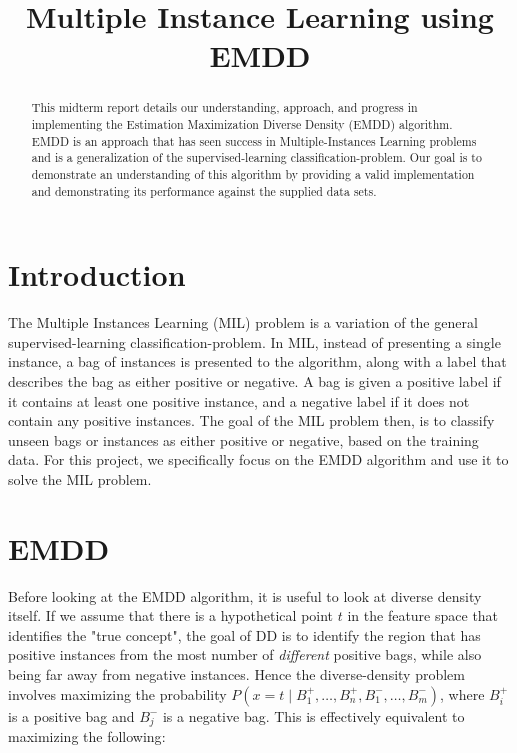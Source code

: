 \documentclass[conference,compsoc]{IEEEtran}
\begin{document}
\title{Multiple Instance Learning using EMDD}

\author{
\and
{}
}

\maketitle

\begin{abstract}
This midterm report details our understanding, approach, and progress in implementing the Estimation Maximization Diverse Density (EMDD)\cite{zhang2001dd} algorithm. EMDD is an approach that has seen success in Multiple-Instances Learning problems and is a generalization of the supervised-learning classification-problem. Our goal is to demonstrate an understanding of this algorithm by providing a valid implementation and demonstrating its performance against the supplied data sets.
\end{abstract}


\IEEEpeerreviewmaketitle


\section{Introduction}
The Multiple Instances Learning (MIL) problem is a variation of the general supervised-learning classification-problem. In MIL, instead of presenting a single instance, a bag of instances is presented to the algorithm, along with a label that describes the bag as either positive or negative. A bag is given a positive label if it contains at least one positive instance, and a negative label if it does not contain any positive instances. The goal of the MIL problem then, is to classify unseen bags or instances as either positive or negative, based on the training data. For this project, we specifically focus on the EMDD algorithm and use it to solve the MIL problem. 

\section{EMDD}

Before looking at the EMDD algorithm, it is useful to look at diverse density itself. If we assume that there is a hypothetical point $t$ in the feature space that identifies the "true concept", the goal of DD is to identify the region that has positive instances from the most number of \textit{different} positive bags, while also being far away from negative instances. Hence the diverse-density problem involves maximizing the probability $P(x = t \mid B_1^+, \dots, B_n^+, B_1^-, \dots, B_m^-)$, where $B_i^+$ is a positive bag and $B_j^-$ is a negative bag. This is effectively equivalent to maximizing the following\cite{zhang2001dd}:
\end{document}
